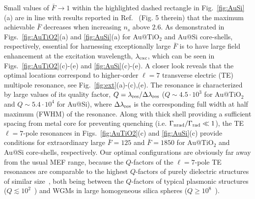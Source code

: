 \documentclass[9pt,twocolumn,twoside]{osajnl}
\newcommand{\ld}{\lambda}
\newcommand{\Gm}{\Gamma}
\newcommand{\Dt}{\Delta}
\begin{document}
Small values of $\bar F\to 1$ within the highlighted dashed rectangle in Fig.~\ref{fig:AuSi}(a) are in line with results reported in Ref.~\cite{Wan2021} (Fig. 5 therein) that the maximum achievable $\bar F$ decreases when increasing $n_s$ above $2.6$.
As demonstrated in Figs.~\ref{fig:AuTiO2}(a) and \ref{fig:AuSi}(a) for Au@TiO$_2$ and Au@Si core-shells, respectively, essential for harnessing exceptionally large $\bar F$ is to have large field enhancement at the excitation wavelength, $\ld_{\rm exc}$, which can be seen in Figs.~\ref{fig:AuTiO2}(c)-(e) and \ref{fig:AuSi}(c)-(e).
A closer look reveals that the optimal locations correspond to higher-order $\ell=7$ transverse electric (TE) multipole resonance, see Fig.~\ref{fig:ext}(a)-(c),(e). 
The resonance is characterized by large values of its quality factor, $Q=\ld_{\rm res}/\Dt\ld_{\rm res}$ ($Q\sim 4.5\cdot 10^3$ for Au@TiO$_2$ and $Q\sim 5.4\cdot 10^4$ for Au@Si), where $\Dt\ld_{\rm res}$ is the corresponding full width at half maximum (FWHM) of the resonance. 
Along with thick shell providing a sufficient spacing from metal core for preventing quenching (i.e. $\Gm_{\rm nrad}/\Gm_{{\rm rad}}\ll 1$), the 
TE $\ell=7$-pole resonances in Figs.~\ref{fig:AuTiO2}(c) and \ref{fig:AuSi}(c) provide conditions for extraordinary large $\bar F=125$ and $\bar F=1850$ for Au@TiO$_2$ and Au@Si core-shells, respectively.
Our optimal configurations are obviously far away from the usual MEF range, because the $Q$-factors of the $\ell=7$-pole TE resonances are comparable to the highest $Q$-factors of purely dielectric structures of similar size~\cite{Huang2021}, both being between the $Q$-factors of typical plasmonic structures ($Q\lesssim 10^2$~\cite{Stockman2011}) and WGMs in large homogeneous silica spheres ($Q\ge 10^8$~\cite{Braginsky1989}). 
\end{document}
